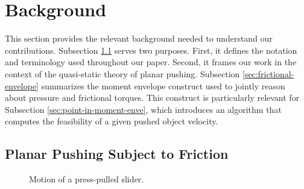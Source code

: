 \documentclass[conference]{IEEEtran}
\newcommand{\BB}[1]{{\color{red} {Byron: {#1}}}}
\begin{document}


\section{Background}\label{sec:background}
This section provides the relevant background needed to understand our
contributions. Subsection \ref{sec:plan-push-subj} serves two
purposes. First, it defines the notation and terminology used
throughout our paper. Second, it frames our work in the context of the
quasi-static theory of planar pushing. Subsection
\ref{sec:frictional-envelope} summarizes the moment envelope construct
used to jointly reason about pressure and frictional torques. This
construct is particularly relevant for Subsection
\ref{sec:point-in-moment-enve}, which introduces an algorithm that
computes the feasibility of a given pushed object velocity.




\subsection{Planar Pushing Subject to Friction}\label{sec:plan-push-subj}

\begin{figure}[t]
  \centering
  \def\iangle{35} %
  \caption{Motion of a press-pulled slider.}
  \label{fig:presspull-motion}
\end{figure}
\end{document}
